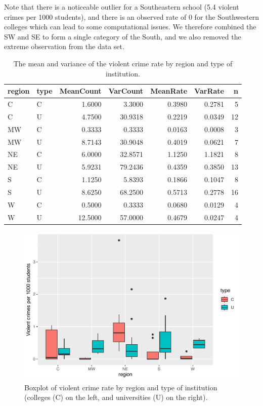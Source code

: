 \documentclass[
]{krantz}
\begin{document}
Note that there is a noticeable outlier for a Southeastern school (5.4 violent crimes per 1000 students), and there is an observed rate of 0 for the Southwestern colleges which can lead to some computational issues. We therefore combined the SW and SE to form a single category of the South, and we also removed the extreme observation from the data set.

\begin{table}

\caption{\label{tab:table4ch4}The mean and variance of the violent crime rate by region and type of institution.}
\centering
\begin{tabular}[t]{llrrrrr}
\toprule
region & type & MeanCount & VarCount & MeanRate & VarRate & n\\
\midrule
C & C & 1.6000 & 3.3000 & 0.3980 & 0.2781 & 5\\
C & U & 4.7500 & 30.9318 & 0.2219 & 0.0349 & 12\\
MW & C & 0.3333 & 0.3333 & 0.0163 & 0.0008 & 3\\
MW & U & 8.7143 & 30.9048 & 0.4019 & 0.0621 & 7\\
NE & C & 6.0000 & 32.8571 & 1.1250 & 1.1821 & 8\\
\addlinespace
NE & U & 5.9231 & 79.2436 & 0.4359 & 0.3850 & 13\\
S & C & 1.1250 & 5.8393 & 0.1866 & 0.1047 & 8\\
S & U & 8.6250 & 68.2500 & 0.5713 & 0.2778 & 16\\
W & C & 0.5000 & 0.3333 & 0.0680 & 0.0129 & 4\\
W & U & 12.5000 & 57.0000 & 0.4679 & 0.0247 & 4\\
\bottomrule
\end{tabular}
\end{table}

\begin{figure}

{\centering \includegraphics[width=0.6\linewidth]{bookdown-BeyondMLR_files/figure-latex/boxtyperegion-1} 

}

\caption{Boxplot of violent crime rate by region and type of institution (colleges (C) on the left, and universities (U) on the right).}\label{fig:boxtyperegion}
\end{figure}
\end{document}

